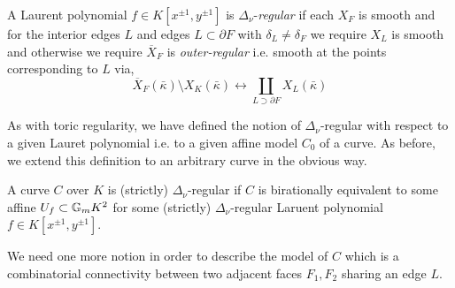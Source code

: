 \documentclass[12pt]{article}
\begin{document}
\begin{defn}
A Laurent polynomial $f \in K[x^{\pm 1}, y^{\pm 1}]$ is $\Delta_\nu$-\textit{regular} if each $X_F$ is smooth and for the interior edges $L$ and edges $L \subset \partial F$ with $\delta_L \neq \delta_F$ we require $X_L$ is smooth and otherwise we require $\overline{X}_F$ is \textit{outer-regular} i.e. smooth at the points corresponding to $L$ via,
\[ \overline{X}_F(\bar{\kappa}) \setminus X_K(\bar{\kappa}) \longleftrightarrow \coprod_{L \supset \partial F} X_L(\bar{\kappa}) \]
\end{defn}

\begin{rmk}
As with toric regularity, we have defined the notion of $\Delta_\nu$-regular with respect to a given Lauret polynomial i.e. to a given affine model $C_0$ of a curve. As before, we extend this definition to an arbitrary curve in the obvious way.
\end{rmk}

\begin{defn}
A curve $C$ over $K$ is (strictly) $\Delta_\nu$-regular if $C$ is birationally equivalent to some affine $U_f \subset \mathbb{G}_m{K}^2$ for some (strictly) $\Delta_\nu$-regular Laruent polynomial $f \in K[x^{\pm 1}, y^{\pm 1}]$. 
\end{defn}

\begin{rmk}
We need one more notion in order to describe the model of $C$ which is a combinatorial connectivity between two adjacent faces $F_1, F_2$ sharing an edge $L$. 
\end{rmk}
\end{document}
